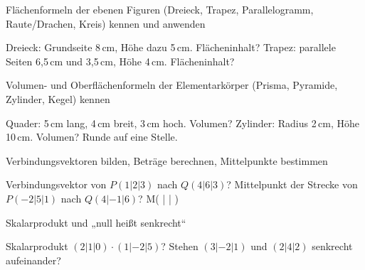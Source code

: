 \setcounter{aufgabe}{0}

\begin{aufgabe}{Flächenformeln der ebenen Figuren (Dreieck, Trapez, Parallelogramm, Raute/Drachen, Kreis) kennen und anwenden}
\begin{teile}
\teil Dreieck: Grundseite 8\,cm, Höhe dazu 5\,cm. Flächeninhalt? \leerfeld[cm²]
\teil Trapez: parallele Seiten 6{,}5\,cm und 3{,}5\,cm, Höhe 4\,cm. Flächeninhalt? \leerfeld[cm²]
\end{teile}
\end{aufgabe}

\begin{aufgabe}{Volumen- und Oberflächenformeln der Elementarkörper (Prisma, Pyramide, Zylinder, Kegel) kennen}
\begin{teile}
\teil Quader: 5\,cm lang, 4\,cm breit, 3\,cm hoch. Volumen? \leerfeld[cm³]
\teil Zylinder: Radius 2\,cm, Höhe 10\,cm. Volumen? Runde auf eine Stelle. \leerfeld[cm³]
\end{teile}
\end{aufgabe}

\begin{aufgabe}{Verbindungsvektoren bilden, Beträge berechnen, Mittelpunkte bestimmen}
\begin{teile}
\teil Verbindungsvektor von $P(1 | 2 | 3)$ nach $Q(4 | 6 | 3)$? \leerfeld
\teil Mittelpunkt der Strecke von $P(-2 | 5 | 1)$ nach $Q(4 | -1 | 6)$? M( \leerfeld | \leerfeld | \leerfeld )
\end{teile}
\end{aufgabe}

\begin{aufgabe}{Skalarprodukt und „null heißt senkrecht“}
\begin{teile}
\teil Skalarprodukt $(2 | 1 | 0) \cdot (1 | -2 | 5)$? \leerfeld
\teil Stehen $(3 | -2 | 1)$ und $(2 | 4 | 2)$ senkrecht aufeinander? \leerfeld
\end{teile}
\end{aufgabe}

